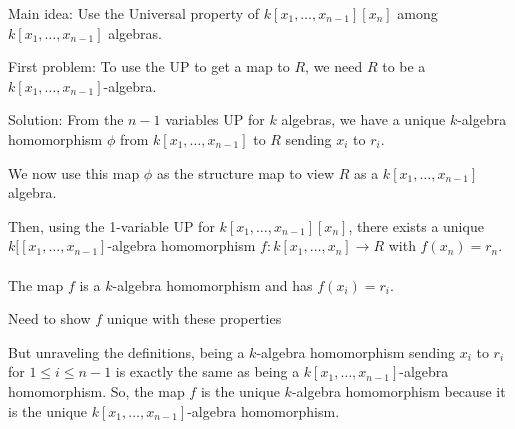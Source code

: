 \documentclass{beamer}
\begin{document}
\begin{frame}

\begin{block}{Main idea:}
Use the Universal property of $k[x_1,\dots, x_{n-1}][x_n]$ among $k[x_1,\dots, x_{n-1}]$ algebras.  
\end{block}

\begin{block}{First problem:}
To use the UP to get a map to $R$, we need $R$ to be a $k[x_1,\dots, x_{n-1}]$-algebra.
\end{block}

\begin{block}{Solution:}
From the $n-1$ variables UP for $k$ algebras, we have a unique $k$-algebra homomorphism $\phi$ from $k[x_1,\dots, x_{n-1}]$ to $R$ sending $x_i$ to $r_i$.  

We now use this map $\phi$ as the structure map to view $R$ as a $k[x_1,\dots, x_{n-1}]$ algebra.  
\end{block}


\end{frame}


\begin{frame}



Then, using the 1-variable UP for $k[x_1,\dots, x_{n-1}][x_n]$, there exists a unique $k[[x_1,\dots, x_{n-1}]$-algebra homomorphism $f:k[x_1,\dots, x_n]\to R$ with $f(x_n)=r_n$.   \\~\\

The map $f$ is a $k$-algebra homomorphism and has $f(x_i)=r_i$.  

\begin{block}{Need to show $f$ unique with these properties}

But unraveling the definitions, being a $k$-algebra homomorphism sending $x_i$ to $r_i$ for $1\leq i\leq n-1$ is exactly the same as being a $k[x_1,\dots, x_{n-1}]$-algebra homomorphism.  So, the map $f$ is the unique $k$-algebra homomorphism because it is the unique $k[x_1,\dots, x_{n-1}]$-algebra homomorphism.
\end{block}
\end{frame}
\end{document}
